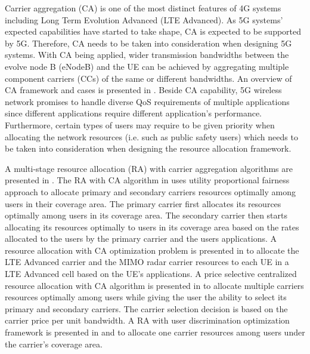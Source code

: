 \documentclass[journal]{IEEEtran} 				\IEEEoverridecommandlockouts 						\usepackage{amsmath,amssymb}
\begin{document}
Carrier aggregation (CA) is one of the most distinct features of 4G systems including Long Term Evolution Advanced (LTE Advanced). As 5G systems' expected capabilities have started to take shape, CA is expected to be supported by 5G. Therefore, CA needs to be taken into consideration when designing 5G systems. With CA being applied, wider transmission bandwidths between the evolve node B (eNodeB) and the UE can be achieved by aggregating multiple component carriers (CCs) of the same or different bandwidths. An overview of CA framework and cases is presented in \cite{CA-framework,work-item}. Beside CA capability, 5G wireless network promises to handle diverse QoS requirements of multiple applications since different applications require different application's performance. Furthermore, certain types of users may require to be given priority when allocating the network resources (i.e. such as public safety users) which needs to be taken into consideration when designing the resource allocation framework.

A multi-stage resource allocation (RA) with carrier aggregation algorithms are presented in \cite{Haya_Utility1,Haya_Utility3,Haya_Utility6}. The RA with CA algorithm in \cite{Haya_Utility1} uses utility proportional fairness approach to allocate primary and secondary carriers resources optimally among users in their coverage area. The primary carrier first allocates its resources optimally among users in its coverage area. The secondary carrier then starts allocating its resources optimally to users in its coverage area based on the rates allocated to the users by the primary carrier and the users applications. A resource allocation with CA optimization problem is presented in \cite{Haya_Utility3} to allocate the LTE Advanced carrier and the MIMO radar carrier resources to each UE in a LTE Advanced cell based on the UE's applications. A price selective centralized resource allocation with CA algorithm is presented in \cite{Haya_Utility6} to allocate multiple carriers resources optimally among users while giving the user the ability to select its primary and secondary carriers. The carrier selection decision is based on the carrier price per unit bandwidth. A RA with user discrimination optimization framework is presented in \cite{Haya_Utility2} and \cite{Haya_Utility4} to allocate one carrier resources among users under the carrier's coverage area.
\end{document}
